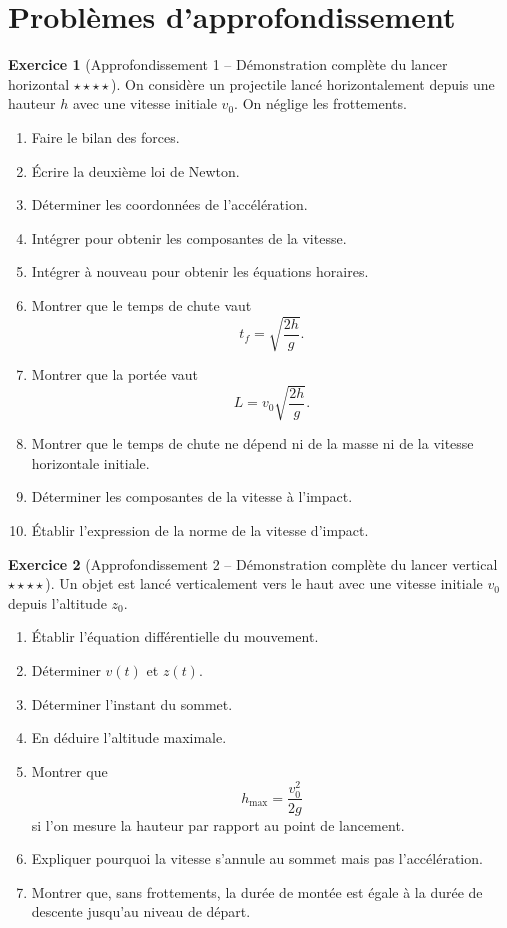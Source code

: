 \documentclass[11pt,a4paper]{article}
\theoremstyle{definition}
\newtheorem{exercice}{Exercice}[section]
\newcommand{\etoiles}[1]{\hfill{\small\textbf{#1}}}
\begin{document}
\section{Problèmes d’approfondissement}

\begin{exercice}[Approfondissement 1 -- Démonstration complète du lancer horizontal \etoiles{$\star\star\star\star$}]
On considère un projectile lancé horizontalement depuis une hauteur $h$ avec une vitesse initiale $v_0$.
On néglige les frottements.

\begin{enumerate}[label=\arabic*.]
    \item Faire le bilan des forces.
    \item Écrire la deuxième loi de Newton.
    \item Déterminer les coordonnées de l’accélération.
    \item Intégrer pour obtenir les composantes de la vitesse.
    \item Intégrer à nouveau pour obtenir les équations horaires.
    \item Montrer que le temps de chute vaut
    \[
    t_f=\sqrt{\frac{2h}{g}}.
    \]
    \item Montrer que la portée vaut
    \[
    L=v_0\sqrt{\frac{2h}{g}}.
    \]
    \item Montrer que le temps de chute ne dépend ni de la masse ni de la vitesse horizontale initiale.
    \item Déterminer les composantes de la vitesse à l’impact.
    \item Établir l’expression de la norme de la vitesse d’impact.
\end{enumerate}
\end{exercice}

\begin{exercice}[Approfondissement 2 -- Démonstration complète du lancer vertical \etoiles{$\star\star\star\star$}]
Un objet est lancé verticalement vers le haut avec une vitesse initiale $v_0$ depuis l’altitude $z_0$.

\begin{enumerate}[label=\arabic*.]
    \item Établir l’équation différentielle du mouvement.
    \item Déterminer $v(t)$ et $z(t)$.
    \item Déterminer l’instant du sommet.
    \item En déduire l’altitude maximale.
    \item Montrer que
    \[
    h_{\max}=\frac{v_0^2}{2g}
    \]
    si l’on mesure la hauteur par rapport au point de lancement.
    \item Expliquer pourquoi la vitesse s’annule au sommet mais pas l’accélération.
    \item Montrer que, sans frottements, la durée de montée est égale à la durée de descente jusqu’au niveau de départ.
\end{enumerate}
\end{exercice}
\end{document}
